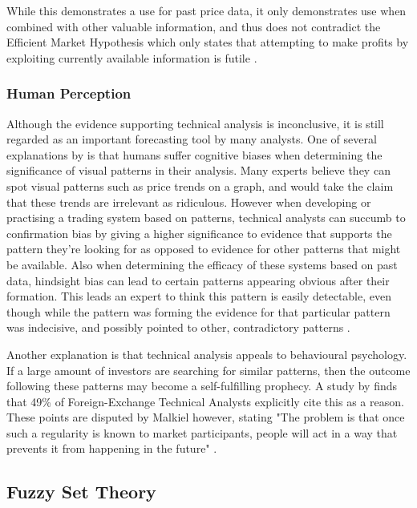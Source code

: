 \documentclass{article}
\theoremstyle{definition}
\begin{document}
While this demonstrates a use for past price data, it only demonstrates use when combined with other valuable information, and thus does not contradict the Efficient Market Hypothesis which only states that attempting to make profits by exploiting currently available information is futile \citep{taprofitability}.

\subsubsection{Human Perception}

Although the evidence supporting technical analysis is inconclusive, it is still regarded as an important forecasting tool by many analysts. One of several explanations by \cite[p.45-71]{aronson2011evidence} is that humans suffer cognitive biases when determining the significance of visual patterns in their analysis. Many experts believe they can spot visual patterns such as price trends on a graph, and would take the claim that these trends are irrelevant as ridiculous. However when developing or practising a trading system based on patterns, technical analysts can succumb to confirmation bias by giving a higher significance to evidence that supports the pattern they're looking for as opposed to evidence for other patterns that might be available. Also when determining the efficacy of these systems based on past data, hindsight bias can lead to certain patterns appearing obvious after their formation. This leads an expert to think this pattern is easily detectable, even though while the pattern was forming the evidence for that particular pattern was indecisive, and possibly pointed to other, contradictory patterns \cite[p.62]{aronson2011evidence}.

Another explanation is that technical analysis appeals to behavioural psychology. If a large amount of investors are searching for similar patterns, then the outcome following these patterns may become a self-fulfilling prophecy. A study by \cite{examininguse1997} finds that 49\% of Foreign-Exchange Technical Analysts explicitly cite this as a reason. These points are disputed by Malkiel however, stating "The problem is that once such a regularity is known to market participants, people will act in a way that prevents it from happening in the future" \cite[p.162]{randomwalk2012}.

\subsection{Fuzzy Set Theory}
\end{document}
